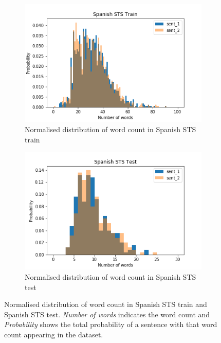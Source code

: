 \begin{enumerate}
\begin{figure}
	\captionsetup[subfigure]{justification=centering}
	\centering
	\begin{subfigure}[b]{.5\textwidth}
		\centering
		\includegraphics[width=\textwidth]{figures/semantic_textual_similarity/introduction/spanish_sts_train_words.png}
		\caption{Normalised distribution of word count in Spanish STS train}
		\label{fig:spanish_sts_train_words}
	\end{subfigure}%
	\begin{subfigure}[b]{.5\textwidth}
		\centering
		\includegraphics[width=\textwidth]{figures/semantic_textual_similarity/introduction/spanish_sts_test_words.png}
		\caption{Normalised distribution of word count in Spanish STS test}
		\label{fig:spanish_sts_test_words}
	\end{subfigure}
	\caption[Normalised distribution of word count inSpanish STS train and Spanish STS test.]{Normalised distribution of word count in Spanish STS train and Spanish STS test. \textit{Number of words} indicates the word count and \textit{Probability} shows the total probability of a sentence with that word count appearing in the dataset.}
	\label{fig:spanish_sts_words}
\end{figure}


\end{enumerate}
